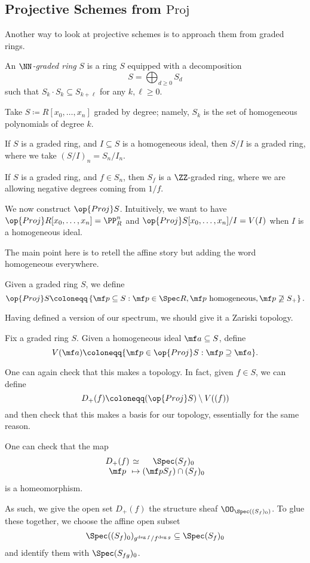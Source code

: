 \documentclass[../notes.tex]{subfiles}
\begin{document}
\subsection{Projective Schemes from \texorpdfstring{$\mathrm{Proj}$} {Proj}}
Another way to look at projective schemes is to approach them from graded rings.
\begin{definition}
	An \textit{$\NN$-graded ring} $S$ is a ring $S$ equipped with a decomposition
	\[S=\bigoplus_{d\ge0}S_d\]
	such that $S_k\cdot S_k\subseteq S_{k+\ell}$ for any $k,\ell\ge0$.
\end{definition}
\begin{example}
	Take $S\coloneqq R[x_0,\ldots,x_n]$ graded by degree; namely, $S_k$ is the set of homogeneous polynomials of degree $k$.
\end{example}
\begin{example}
	If $S$ is a graded ring, and $I\subseteq S$ is a homogeneous ideal, then $S/I$ is a graded ring, where we take $(S/I)_n=S_n/I_n$.
\end{example}
\begin{example}
	If $S$ is a graded ring, and $f\in S_n$, then $S_f$ is a $\ZZ$-graded ring, where we are allowing negative degrees coming from $1/f$.
\end{example}
We now construct $\op{Proj}S$. Intuitively, we want to have $\op{Proj}R[x_0,\ldots,x_n]=\PP^n_R$ and $\op{Proj}S[x_0,\ldots,x_n]/I=V(I)$ when $I$ is a homogeneous ideal.

The main point here is to retell the affine story but adding the word homogeneous everywhere.
\begin{defihelper} 
	Given a graded ring $S$, we define
	\[\op{Proj}S\coloneqq\left\{\mf p\subseteq S:\mf p\in\Spec R,\mf p\text{ homogeneous},\mf p\not\supseteq S_+\right\}.\]
\end{defihelper}
Having defined a version of our spectrum, we should give it a Zariski topology.
\begin{defihelper} 
	Fix a graded ring $S$. Given a homogeneous ideal $\mf a\subseteq S$, define
	\[V(\mf a)\coloneqq\{\mf p\in\op{Proj}S:\mf p\supseteq\mf a\}.\]
\end{defihelper}
One can again check that this makes a topology. In fact, given $f\in S$, we can define
\[D_+(f)\coloneqq(\op{Proj}S)\setminus V((f))\]
and then check that this makes a basis for our topology, essentially for the same reason.
\begin{remark}
	One can check that the map
	\[\arraycolsep=1.4pt\begin{array}{ccc}
		D_+(f) &\simeq& \Spec (S_f)_0 \\
		\mf p &\mapsto& (\mf pS_f)\cap(S_f)_0
	\end{array}\]
	is a homeomorphism.
\end{remark}
As such, we give the open set $D_+(f)$ the structure sheaf $\OO_{\Spec((S_f)_0)}$. To glue these together, we choose the affine open subset
\[\Spec((S_f)_0)_{g^{\deg f}/f^{\deg g}}\subseteq\Spec(S_f)_0\]
and identify them with $\Spec(S_{fg})_0$.
\end{document}
